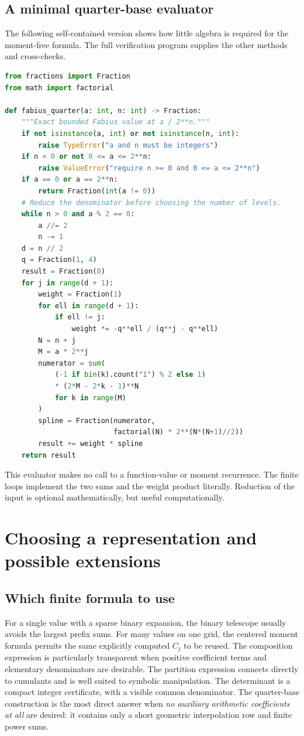 \documentclass[11pt,oneside]{article}
\theoremstyle{definition}\newtheorem{definition}[theorem]{Definition}
\theoremstyle{remark}\newtheorem{remark}[theorem]{Remark}
\begin{document}
\subsection{A minimal quarter-base evaluator}
The following self-contained version shows how little algebra is required
for the moment-free formula. The full verification program supplies the
other methods and cross-checks.
\begin{lstlisting}[language=Python,basicstyle=\ttfamily\footnotesize]
from fractions import Fraction
from math import factorial

def fabius_quarter(a: int, n: int) -> Fraction:
    """Exact bounded Fabius value at a / 2**n."""
    if not isinstance(a, int) or not isinstance(n, int):
        raise TypeError("a and n must be integers")
    if n < 0 or not 0 <= a <= 2**n:
        raise ValueError("require n >= 0 and 0 <= a <= 2**n")
    if a == 0 or a == 2**n:
        return Fraction(int(a != 0))
    # Reduce the denominator before choosing the number of levels.
    while n > 0 and a % 2 == 0:
        a //= 2
        n -= 1
    d = n // 2
    q = Fraction(1, 4)
    result = Fraction(0)
    for j in range(d + 1):
        weight = Fraction(1)
        for ell in range(d + 1):
            if ell != j:
                weight *= -q**ell / (q**j - q**ell)
        N = n + j
        M = a * 2**j
        numerator = sum(
            (-1 if bin(k).count("1") % 2 else 1)
            * (2*M - 2*k - 1)**N
            for k in range(M)
        )
        spline = Fraction(numerator,
                          factorial(N) * 2**(N*(N+1)//2))
        result += weight * spline
    return result
\end{lstlisting}
This evaluator makes no call to a function-value or moment recurrence.
The finite loops implement the two sums and the weight product literally.
Reduction of the input is optional mathematically, but useful computationally.

\section{Choosing a representation and possible extensions}
\label{sec:conclusions}

\subsection{Which finite formula to use}
For a single value with a sparse binary expansion, the binary telescope
usually avoids the largest prefix sums. For many values on one grid, the
centered moment formula permits the same explicitly computed $C_j$ to be
reused. The composition expression is particularly transparent when positive
coefficient terms and elementary denominators are desirable. The partition
expression connects directly to cumulants and is well suited to symbolic
manipulation. The determinant is a compact integer certificate, with a
visible common denominator. The quarter-base construction is the most direct
answer when \emph{no auxiliary arithmetic coefficients at all} are desired:
it contains only a short geometric interpolation row and finite power sums.
\end{document}
